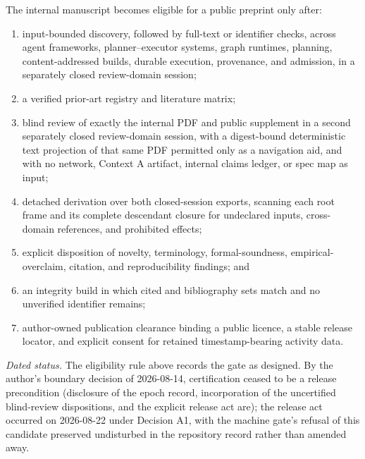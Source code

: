 \documentclass[11pt]{article}
\begin{document}
  The internal manuscript becomes eligible for a public preprint only after:

  \begin{enumerate}
    \item input-bounded discovery, followed by full-text or identifier checks,
    across agent frameworks, planner--executor systems, graph runtimes,
    planning, content-addressed builds, durable execution, provenance, and
    admission, in a separately closed review-domain session;
    \item a verified prior-art registry and literature matrix;
    \item blind review of exactly the internal PDF and public supplement in a
    second separately closed review-domain session, with a digest-bound
    deterministic text projection of that same PDF permitted only as a
    navigation aid, and with no network, Context A artifact, internal claims
    ledger, or spec map as input;
    \item detached derivation over both closed-session exports, scanning each
    root frame and its complete descendant closure for undeclared inputs,
    cross-domain references, and prohibited effects;
    \item explicit disposition of novelty, terminology, formal-soundness,
    empirical-overclaim, citation, and reproducibility findings; and
    \item an integrity build in which cited and bibliography sets match and no
    unverified identifier remains;
    \item author-owned publication clearance binding a public licence, a stable
    release locator, and explicit consent for retained timestamp-bearing
    activity data.
  \end{enumerate}

  \emph{Dated status.} The eligibility rule above records the gate as
  designed. By the author's boundary decision of 2026-08-14,
  certification ceased to be a release precondition (disclosure of the
  epoch record, incorporation of the uncertified blind-review
  dispositions, and the explicit release act are); the release act
  occurred on 2026-08-22 under Decision A1, with the machine gate's
  refusal of this candidate preserved undisturbed in the repository
  record rather than amended away.
\end{document}
